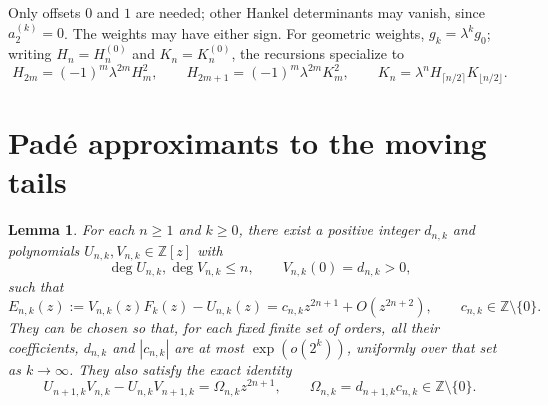 \documentclass{amsart}
\newtheorem{lemma}{Lemma}[section]
\numberwithin{equation}{section}
\newcommand{\Z}{\mathbb Z}
\begin{document}
Only offsets $0$ and $1$ are needed; other Hankel determinants may
vanish, since $a_2^{(k)}=0$. The weights may have either sign.
For geometric weights, $g_k=\lambda^kg_0$; writing $H_n=H_n^{(0)}$
and $K_n=K_n^{(0)}$, the recursions specialize to
\[
H_{2m}=(-1)^m\lambda^{2m}H_m^2,\qquad
H_{2m+1}=(-1)^m\lambda^{2m}K_m^2,\qquad
K_n=\lambda^nH_{\lceil n/2\rceil}K_{\lfloor n/2\rfloor}.
\]

\section{Pad\'e approximants to the moving tails}

\begin{lemma}\label{lem:pade}
For each $n\ge1$ and $k\ge0$, there exist a positive integer $d_{n,k}$
and polynomials $U_{n,k},V_{n,k}\in\Z[z]$ with
\begin{equation}\label{eq:degrees}
\deg U_{n,k},\deg V_{n,k}\le n,\qquad V_{n,k}(0)=d_{n,k}>0,
\end{equation}
such that
\begin{equation}\label{eq:remainder}
E_{n,k}(z):=V_{n,k}(z)F_k(z)-U_{n,k}(z)
=c_{n,k}z^{2n+1}+O(z^{2n+2}),\qquad
c_{n,k}\in\Z\setminus\{0\}.
\end{equation}
They can be chosen so that, for each fixed finite set of orders,
all their coefficients, $d_{n,k}$ and $|c_{n,k}|$ are at most
$\exp(o(2^k))$, uniformly over that set as $k\to\infty$.
They also satisfy the exact identity
\begin{equation}\label{eq:adjacent}
U_{n+1,k}V_{n,k}-U_{n,k}V_{n+1,k}
 =\Omega_{n,k}z^{2n+1},\qquad
\Omega_{n,k}=d_{n+1,k}c_{n,k}\in\Z\setminus\{0\}.
\end{equation}
\end{lemma}
\end{document}
